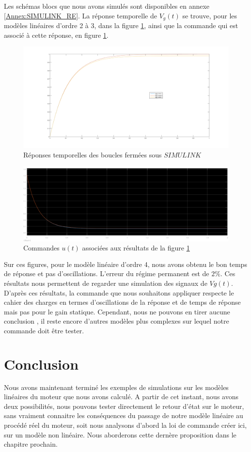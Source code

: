 Les schémas blocs que nous avons simulés sont disponibles en annexe \ref{Annex:SIMULINK_RE}. La réponse temporelle de $V_g(t)$ se trouve, pour les modèles linéaires d'ordre 2 à 3, dans la figure \ref{fig:reponseModelesLineairesSIMULINK}, ainsi que la commande qui est associé à cette réponse, en figure \ref{fig:reponseModelesLineairesSIMULINK}.\begin{figure}[!ht]
\centering
\includegraphics[width = .7\textwidth]{./III/figure/res_SIMULINK.png}
\caption{Réponses temporelles des boucles fermées sous $SIMULINK$\label{fig:reponseModelesLineairesSIMULINK}}
\end{figure}


\begin{figure}[!ht]
\centering
\includegraphics[width = .7\textwidth]{./III/figure/commande-u-ML_ordre2-3-4.pdf}
\caption{Commandes $u(t)$ associées aux résultats de la figure \ref{fig:reponseModelesLineairesSIMULINK}\label{fig:commandesML-1V}}
\end{figure}


Sur ces figures, pour le modèle linéaire d'ordre 4, nous avons obtenu le bon temps de réponse et pas d'oscillations. L'erreur du régime permanent est de $2\%$.
Ces résultats nous permettent de regarder une simulation des signaux de $Vg(t)$. D'après ces résultats, la commande que nous souhaitons appliquer respecte le cahier des charges en termes d'oscillations de la réponse et de temps de réponse mais pas pour le gain statique. Cependant, nous ne pouvons en tirer aucune conclusion , il reste encore d'autres modèles plus complexes sur lequel notre commande doit être tester.

\section{Conclusion}
Nous avons maintenant terminé les exemples de simulations sur les modèles linéaires du moteur que nous avons calculé. A partir de cet instant, nous avons deux possibilités, nous pouvons tester directement le retour d'état sur le moteur, sans vraiment connaitre les conséquences du passage de notre modèle linéaire au procédé réel du moteur, soit nous analysons d'abord la loi de commande créer ici, sur un modèle non linéaire. Nous aborderons cette dernère proposition dans le chapitre prochain.


